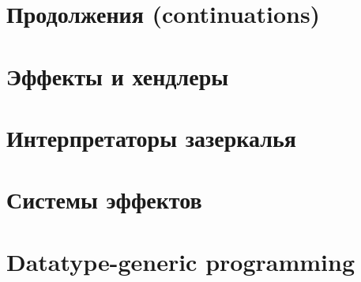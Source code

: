 \documentclass[12pt]{article}
\begin{document}
    \section{Продолжения (continuations)} \label{sec:continuations}
%
%    
%


    \section{Эффекты и хендлеры} \label{sec:effect-handlers}
%
%
%    


    \section{Интерпретаторы зазеркалья} \label{sec:wonder-interpreters}
%
%    
%


%
%    


    \section{Системы эффектов} \label{sec:effect-systems}
%
%    
%


    \section{Datatype-generic programming} \label{sec:datatype-generic}
%
%    
%




%
%    






    
\end{document}
